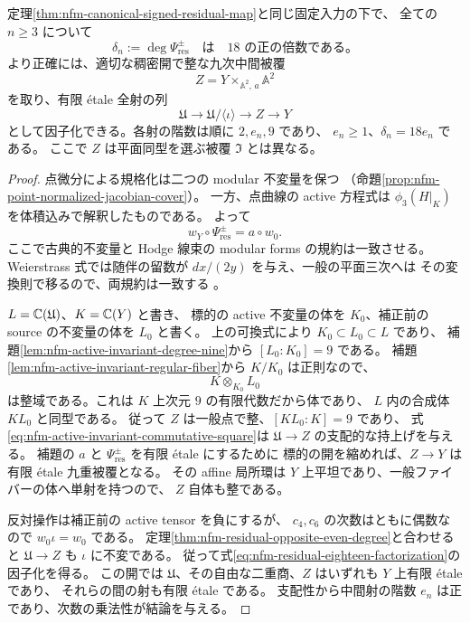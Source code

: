 \begin{theorem}[九次中間被覆と残余射の十八次因子]
\label{thm:nfm-residual-degree-eighteen}
定理\ref{thm:nfm-canonical-signed-residual-map}と同じ固定入力の下で、
全ての $n\ge3$ について
\[
 \delta_n:=\deg\Psi_{\mathrm{res}}^\pm
 \quad\text{は}\quad18\text{ の正の倍数である。}
\]
より正確には、適切な稠密開で整な九次中間被覆
\[
 Z=Y\mathbin{\times}_{\mathbb A^2,\,a}\mathbb A^2
\]
を取り、有限 \'etale 全射の列
\begin{equation}\label{eq:nfm-residual-eighteen-factorization}
 \mathfrak U\longrightarrow
 \mathfrak U/\langle\iota\rangle\longrightarrow Z\longrightarrow Y
\end{equation}
として因子化できる。各射の階数は順に $2,e_n,9$ であり、
$e_n\ge1$、$\delta_n=18e_n$ である。
ここで $Z$ は平面同型を選ぶ被覆 $\mathfrak I$ とは異なる。
\end{theorem}

\begin{proof}
点微分による規格化は二つの modular 不変量を保つ
（命題\ref{prop:nfm-point-normalized-jacobian-cover}）。
一方、点曲線の active 方程式は $\phi_3(H|_K)$ を体積込みで解釈したものである。
よって
\begin{equation}\label{eq:nfm-active-invariant-commutative-square}
 w_Y\circ\Psi_{\mathrm{res}}^\pm=a\circ w_0.
\end{equation}
ここで古典的不変量と Hodge 線束の modular forms の規約は一致させる。
Weierstrass 式では随伴の留数が $dx/(2y)$ を与え、一般の平面三次へは
その変換則で移るので、両規約は一致する
\cite[Theorem~1.1(i), Lemma~2.6]{NFMFisherTernary}。

$L=\mathbb C(\mathfrak U)$、$K=\mathbb C(Y)$ と書き、
標的の active 不変量の体を $K_0$、補正前の source の不変量の体を $L_0$ と書く。
上の可換式により $K_0\subset L_0\subset L$ であり、
補題\ref{lem:nfm-active-invariant-degree-nine}から $[L_0:K_0]=9$ である。
補題\ref{lem:nfm-active-invariant-regular-fiber}から $K/K_0$ は正則なので、
\[
 K\otimes_{K_0}L_0
\]
は整域である。これは $K$ 上次元 $9$ の有限代数だから体であり、
$L$ 内の合成体 $KL_0$ と同型である。
従って $Z$ は一般点で整、$[KL_0:K]=9$ であり、
式\eqref{eq:nfm-active-invariant-commutative-square}は
$\mathfrak U\to Z$ の支配的な持上げを与える。
補題の $a$ と $\Psi_{\mathrm{res}}^\pm$ を有限 \'etale にするために
標的の開を縮めれば、$Z\to Y$ は有限 \'etale 九重被覆となる。
その affine 局所環は $Y$ 上平坦であり、一般ファイバーの体へ単射を持つので、
$Z$ 自体も整である。

反対操作は補正前の active tensor を負にするが、
$c_4,c_6$ の次数はともに偶数なので $w_0\iota=w_0$ である。
定理\ref{thm:nfm-residual-opposite-even-degree}と合わせると
$\mathfrak U\to Z$ も $\iota$ に不変である。
従って式\eqref{eq:nfm-residual-eighteen-factorization}の因子化を得る。
この開では $\mathfrak U$、その自由な二重商、$Z$ はいずれも $Y$ 上有限 \'etale であり、
それらの間の射も有限 \'etale である。
支配性から中間射の階数 $e_n$ は正であり、次数の乗法性が結論を与える。
\end{proof}

